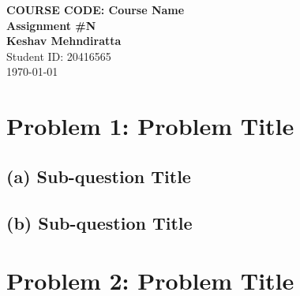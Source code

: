 \documentclass[12pt]{article}
\begin{document}
\begin{titlepage}
    \centering
    \vspace*{2in}
    {\Huge \textbf{COURSE CODE: Course Name}} \\
    \vspace{0.5in}
    {\LARGE \textbf{Assignment \#N}} \\
    \vspace{1.5in}
    {\Large \textbf{Keshav Mehndiratta}} \\
    \vspace{0.2in}
    {\large Student ID: 20416565} \\
    \vfill
    {\large \today}
\end{titlepage}

\section*{Problem 1: Problem Title}

\subsection*{(a) Sub-question Title}


\subsection*{(b) Sub-question Title}


\newpage

\section*{Problem 2: Problem Title}

\end{document}

